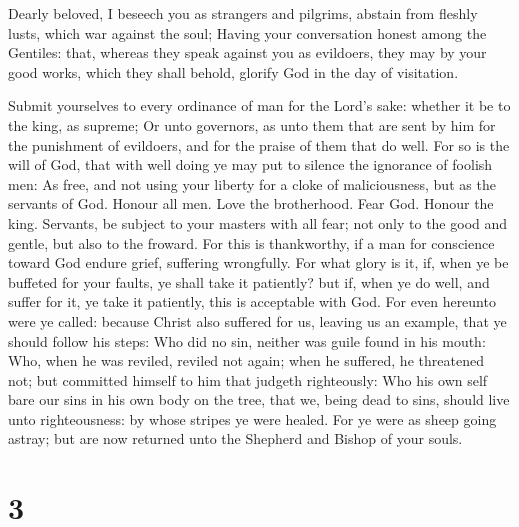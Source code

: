  Dearly beloved, I beseech you as strangers and pilgrims,
abstain from fleshly lusts, which war against the soul; 
Having your conversation honest among the Gentiles: that, whereas they
speak against you as evildoers, they may by your good works, which they
shall behold, glorify God in the day of visitation.

 Submit yourselves to every ordinance of man for the Lord's
sake: whether it be to the king, as supreme;  Or unto
governors, as unto them that are sent by him for the punishment of
evildoers, and for the praise of them that do well.  For so
is the will of God, that with well doing ye may put to silence the
ignorance of foolish men:  As free, and not using your
liberty for a cloke of maliciousness, but as the servants of God.
 Honour all men. Love the brotherhood. Fear God. Honour the
king.  Servants, be subject to your masters with all fear;
not only to the good and gentle, but also to the froward. 
For this is thankworthy, if a man for conscience toward God endure
grief, suffering wrongfully.  For what glory is it, if,
when ye be buffeted for your faults, ye shall take it patiently? but if,
when ye do well, and suffer for it, ye take it patiently, this is
acceptable with God.  For even hereunto were ye called:
because Christ also suffered for us, leaving us an example, that ye
should follow his steps:  Who did no sin, neither was guile
found in his mouth:  Who, when he was reviled, reviled not
again; when he suffered, he threatened not; but committed himself to him
that judgeth righteously:  Who his own self bare our sins
in his own body on the tree, that we, being dead to sins, should live
unto righteousness: by whose stripes ye were healed.  For
ye were as sheep going astray; but are now returned unto the Shepherd
and Bishop of your souls.

\hypertarget{section-2}{%
\section{3}\label{section-2}}

